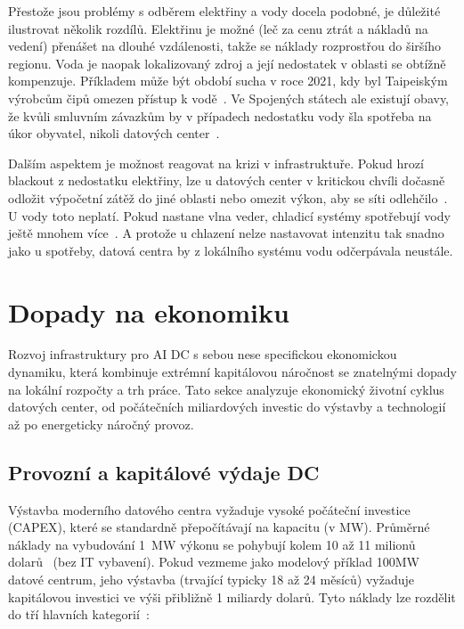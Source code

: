 Přestože jsou problémy s odběrem elektřiny a vody docela podobné, je důležité ilustrovat několik rozdílů. Elektřinu je možné (leč za cenu ztrát a nákladů na vedení) přenášet na dlouhé vzdálenosti, takže se náklady rozprostřou do širšího regionu. Voda je naopak lokalizovaný zdroj a její nedostatek v oblasti se obtížně kompenzuje. Příkladem může být období sucha v roce 2021, kdy byl Taipeiským výrobcům čipů omezen přístup k vodě~\cite[s.~243]{international_energy_agency_iea_energy_2025}. Ve Spojených státech ale existují obavy, že kvůli smluvním závazkům by v případech nedostatku vody šla spotřeba na úkor obyvatel, nikoli datových center~\cite{shah_four_2026}.

Dalším aspektem je možnost reagovat na krizi v infrastruktuře. Pokud hrozí blackout z nedostatku elektřiny, lze u datových center v kritickou chvíli dočasně odložit výpočetní zátěž do jiné oblasti nebo omezit výkon, aby se síti odlehčilo~\cite[s.~586]{geng_data_2014}. U vody toto neplatí. Pokud nastane vlna veder, chladicí systémy spotřebují vody ještě mnohem více~\cite[s.~3]{li_making_2025}. A protože u chlazení nelze nastavovat intenzitu tak snadno jako u spotřeby, datová centra by z lokálního systému vodu odčerpávala neustále.

\section{Dopady na ekonomiku}
\label{sec:ekonomika_dopady}

Rozvoj infrastruktury pro AI DC s sebou nese specifickou ekonomickou dynamiku, která kombinuje extrémní kapitálovou náročnost se znatelnými dopady na lokální rozpočty a trh práce. Tato sekce analyzuje ekonomický životní cyklus datových center, od počátečních miliardových investic do výstavby a technologií až po energeticky náročný provoz.

\subsection{Provozní a kapitálové výdaje DC}
\label{subsec:vydaje}

Výstavba moderního datového centra vyžaduje vysoké počáteční investice (CAPEX), které se standardně přepočítávají na kapacitu (v MW). Průměrné náklady na vybudování 1~MW výkonu se pohybují kolem 10 až 11 milionů dolarů~\cites[s. 7]{to_albertas_2025}[s. 25]{gargano_subsidizing_2025} (bez IT vybavení). Pokud vezmeme jako modelový příklad 100MW datové centrum, jeho výstavba (trvající typicky 18 až 24 měsíců) vyžaduje kapitálovou investici ve výši přibližně 1 miliardy dolarů. Tyto náklady lze rozdělit do tří hlavních kategorií~\cite[s.~9]{pham_data_2017}:

